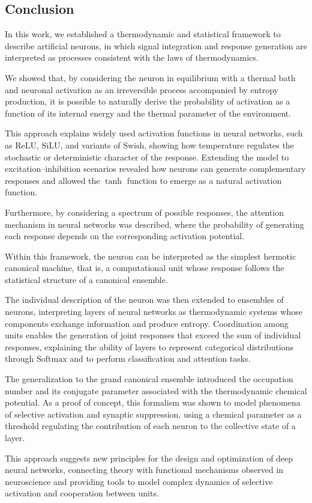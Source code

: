 \documentclass[12pt]{article}
\begin{document}
\subsection{Conclusion}

In this work, we established a thermodynamic and statistical framework to describe artificial neurons, in which signal integration and response generation are interpreted as processes consistent with the laws of thermodynamics.

We showed that, by considering the neuron in equilibrium with a thermal bath and neuronal activation as an irreversible process accompanied by entropy production, it is possible to naturally derive the probability of activation as a function of its internal energy and the thermal parameter of the environment.

This approach explains widely used activation functions in neural networks, such as $\text{ReLU}$, $\text{SiLU}$, and variants of $\text{Swish}$, showing how temperature regulates the stochastic or deterministic character of the response. Extending the model to excitation–inhibition scenarios revealed how neurons can generate complementary responses and allowed the $\tanh$ function to emerge as a natural activation function. 

Furthermore, by considering a spectrum of possible responses, the attention mechanism in neural networks was described, where the probability of generating each response depends on the corresponding activation potential.

Within this framework, the neuron can be interpreted as the simplest hermotic canonical machine, that is, a computational unit whose response follows the statistical structure of a canonical ensemble.

The individual description of the neuron was then extended to ensembles of neurons, interpreting layers of neural networks as thermodynamic systems whose components exchange information and produce entropy. Coordination among units enables the generation of joint responses that exceed the sum of individual responses, explaining the ability of layers to represent categorical distributions through $\text{Softmax}$ and to perform classification and attention tasks.

The generalization to the grand canonical ensemble introduced the occupation number and its conjugate parameter associated with the thermodynamic chemical potential. As a proof of concept, this formalism was shown to model phenomena of selective activation and synaptic suppression, using a chemical parameter as a threshold regulating the contribution of each neuron to the collective state of a layer.

This approach suggests new principles for the design and optimization of deep neural networks, connecting theory with functional mechanisms observed in neuroscience and providing tools to model complex dynamics of selective activation and cooperation between units.
\end{document}
